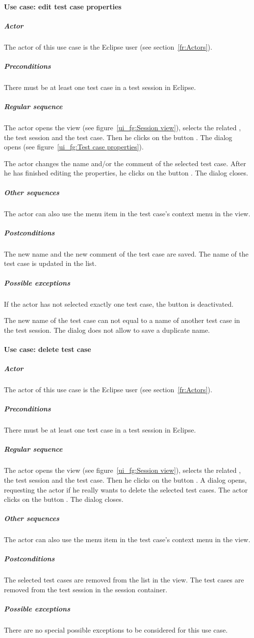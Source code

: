 \paragraph{Use case: edit test case properties}
\subparagraph{Actor}
The actor of this use case is the Eclipse user (see section~\ref{fr:Actors}).
\subparagraph{Preconditions}
There must be at least one test case in a test session in Eclipse.
\subparagraph{Regular sequence}
The actor opens the  view (see figure~\ref{ui_fg:Session view}), selects the related , the test session and the test case. Then he clicks on the button . The dialog  opens (see figure~\ref{ui_fg:Test case properties}).
\par
The actor changes the name and/or the comment of the selected test case. After he has finished editing the properties, he clicks on the button . The dialog closes.
\subparagraph{Other sequences}
The actor can also use the menu item  in the test case's context menu in the  view.
\subparagraph{Postconditions}
The new name and the new comment of the test case are saved. The name of the test case is updated in the list.
\subparagraph{Possible exceptions}
If the actor has not selected exactly one test case, the button  is deactivated.
\par The new name of the test case can not equal to a name of another test case in the test session. The dialog does not allow to save a duplicate name.

\paragraph{Use case: delete test case}
\subparagraph{Actor}
The actor of this use case is the Eclipse user (see section~\ref{fr:Actors}).
\subparagraph{Preconditions}
There must be at least one test case in a test session in Eclipse.
\subparagraph{Regular sequence}
The actor opens the  view (see figure~\ref{ui_fg:Session view}), selects the related , the test session and the test case. Then he clicks on the button . A dialog opens, requesting the actor if he really wants to delete the selected test cases. The actor clicks on the button . The dialog closes.
\subparagraph{Other sequences}
The actor can also use the menu item  in the test case's context menu in the  view.
\subparagraph{Postconditions}
The selected test cases are removed from the list in the  view. The test cases are removed from the test session in the session container.
\subparagraph{Possible exceptions}
There are no special possible exceptions to be considered for this use case.

